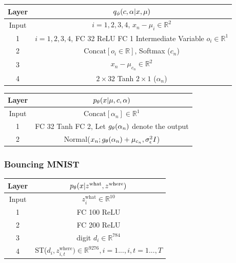 \documentclass{article}
\theoremstyle{definition}
\begin{document}
\begin{table}[!h]
    \centering
    \begin{tabular}{c|c}
    \toprule
        \textbf{Layer} &
        $q_\phi(c, \alpha | x, \mu)$ \\
    \midrule
    Input  
    & 
    $i=1,2,3,4$, $x_n - \mu_i \in\mathbb{R}^2$ \\
    \hline 
    1  
    & 
    $i=1,2,3,4$, FC 32 ReLU FC 1 Intermediate Variable $o_i\in\mathbb{R}^1$ \\
    \hline 
    2 & $\mathrm{Concat}[o_i\in\mathbb{R}]$, Softmax ($c_n$) \\
    \hline
    3 & $x_n - \mu_{c_n}\in\mathbb{R}^2$ \\
    \hline
    4 &  $2\times32$ Tanh $2\times1$ ($\alpha_n$) \\
    \bottomrule
    \end{tabular}
    \label{arch-dgmm-assignment}
\end{table}

\begin{table}[h!]
    \centering
    \begin{tabular}{c|c}
    \toprule
    \textbf{Layer}
    &
    $p_\theta(x | \mu, c, \alpha)$ \\
    \midrule
    Input
    &
    $\mathrm{Concat}[\alpha_n]\in\mathbb{R}^1$ 
    \\
    \hline
    1
    &
    FC 32 Tanh FC 2, Let $g_\theta(\alpha_n)$ denote the output \\
    \hline
    2 & Normal($x_n; g_\theta(\alpha_n) + \mu_{c_n}, \sigma_\epsilon^2 I$) \\
    \bottomrule
    \end{tabular}
    \label{arch-dgmm-decoder}
\end{table}

\newpage
\subsubsection*{Bouncing MNIST}
\begin{table}[H]
\centering
\label{arch-bmnist-decoder}
\begin{tabular}{c|c}
    \toprule
    \textbf{Layer} & $p_\theta(x | z^{\mathrm{what}}, z^{\mathrm{where}})$ \\
    \midrule
    Input & $z^{\mathrm{what}}_i \in\mathbb{R}^{10}$
    \\
    \hline
    1 &
    FC 100 ReLU \\
    \hline
    2 &
    FC 200 ReLU \\
    \hline
    3 & digit $d_i\in\mathbb{R}^{784}$\\
    \hline
    4 & ST($d_{i}, z^{\mathrm{where}}_{i, t}) \in\mathbb{R}^{9276}, i=1...,i, t=1...,T$ \\
    \bottomrule
\end{tabular}
\end{table}
\end{document}
